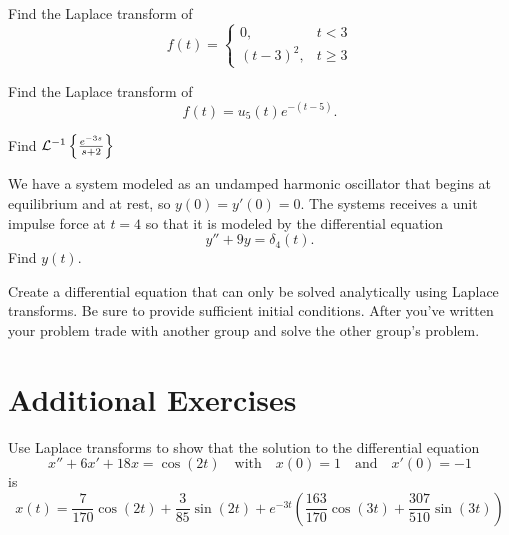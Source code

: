 \begin{problem}
    Find the Laplace transform of
    \[ f(t) = \left\{ \begin{array}{cc} 0, & t < 3 \\ (t-3)^2, & t \ge 3 \end{array} \right.
    \]
\end{problem}

\begin{problem}
    Find the Laplace transform of
    \[ f(t) = u_5(t) e^{-(t-5)}. \]
\end{problem}
\solution{
    \[ \lap{u_5(t) e^{-(t-5)}} = \frac{e^{-5s}}{s+1} \]
}

\begin{problem}
    Find $\mathcal{L}^{-1}\left\{ \frac{e^{-3s}}{s+2} \right\}$
\end{problem}
\solution{
    \[ \lapinv{\frac{e^{-3s}}{s+2}} = u_3(t) e^{-2(t-3)} \]
}



\begin{problem}
    We have a system modeled as an undamped harmonic oscillator that begins at equilibrium
    and at rest, so $y(0) = y'(0) = 0$.  The systems receives a unit impulse force at $t=4$ so
    that it is modeled by the differential equation
    \[ y'' + 9y = \delta_4(t). \]
    Find $y(t)$.
\end{problem}
\solution{
    \[ y(t) = u_4(t) \sin(3(t-4)). \]
}

\begin{problem}
    Create a differential equation that can only be solved analytically using Laplace
    transforms.  Be sure to provide sufficient initial conditions.  After you've written
    your problem trade with another group and solve the other group's problem.
\end{problem}




\newpage\section{Additional Exercises}



\begin{problem}
    Use Laplace transforms to show that the solution to the differential equation
    \[ x'' + 6x' + 18x = \cos(2t) \quad \text{with} \quad x(0) = 1 \quad \text{and} \quad x'(0) =
    -1 \]
    is
    \[ x(t) = \frac{7}{170} \cos(2t) + \frac{3}{85} \sin(2t) + e^{-3t} \left(
        \frac{163}{170} \cos(3t) + \frac{307}{510} \sin(3t)
    \right) \]
\end{problem}

